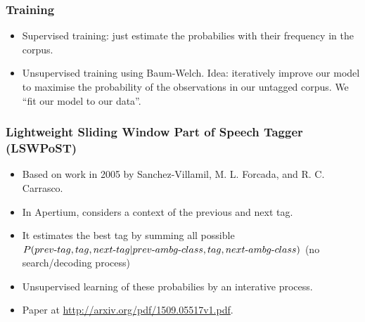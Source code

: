 \documentclass{beamer}
\begin{document}
\begin{frame}
\frametitle{Training}
\begin{itemize}

  \item Supervised training: just estimate the probabilies with their frequency
    in the corpus.

  \item Unsupervised training using Baum-Welch. Idea: iteratively improve our
    model to maximise the probability of the observations in our untagged
    corpus. We ``fit our model to our data''.

\end{itemize}
\end{frame}

\begin{frame}
\frametitle{Lightweight Sliding Window Part of Speech Tagger (LSWPoST)}
\begin{itemize}

  \item Based on work in 2005 by Sanchez-Villamil, M. L. Forcada, and R. C.
    Carrasco.

  \item In Apertium, considers a context of the previous and next tag.

  \item It estimates the best tag by summing all possible
    $P(prev\hbox{-}tag,tag,next\hbox{-}tag|prev\hbox{-}ambg\hbox{-}class,tag,next\hbox{-}ambg\hbox{-}class)$
    (no search/decoding process)

  \item Unsupervised learning of these probabilies by an interative process.

  \item Paper at \url{http://arxiv.org/pdf/1509.05517v1.pdf}.

\end{itemize}
\end{frame}
\end{document}
